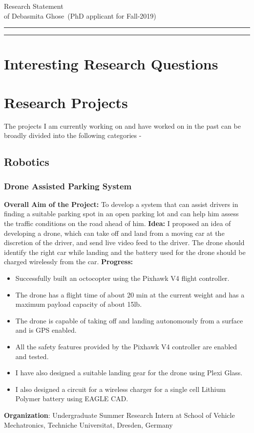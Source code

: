 \documentclass{article}
\newcommand{\soptitle}{Research Statement}
\newcommand{\yourname}{Debasmita Ghose}
\begin{document}
\begin{center}\LARGE\soptitle\\
\large of \yourname\ (PhD applicant for Fall-2019)
\end{center}

\hrule
\vspace{0pt}
\hrule height 1pt

\bigskip
\section{Interesting Research Questions}

\section{Research Projects}

The projects I am currently working on and have worked on in the past can be broadly divided into the following categories -

\subsection{Robotics}   

\subsubsection{Drone Assisted Parking System}

\textbf{Overall Aim of the Project:} To develop a system that can assist drivers in finding a suitable parking spot in an open parking lot and can help him assess the traffic conditions on the road ahead of him.\newline
\textbf{Idea:} I proposed an idea of developing a drone, which can take off and land from a moving car at the discretion of the driver, and send live video feed to the driver. The drone should identify the right car while landing and the battery used for the drone should be charged wirelessly from the car. \newline
\textbf{Progress:}
\begin{itemize}
 \item Successfully built an octocopter using the Pixhawk V4 flight controller. 
 \item The drone has a flight time of about 20 min at the current weight and has a maximum payload capacity of about 15lb. 
 \item The drone is capable of taking off and landing autonomously from a surface and is GPS enabled. 
 \item All the safety features provided by the Pixhawk V4 controller are enabled and tested. 
 \item I have also designed a suitable landing gear for the drone using Plexi Glass. 
 \item I also designed a circuit for a wireless charger for a single cell Lithium Polymer battery using EAGLE CAD.
\end{itemize}
\textbf{Organization}: Undergraduate Summer Research Intern at School of Vehicle Mechatronics, Techniche Universitat, Dresden, Germany
\end{document}
